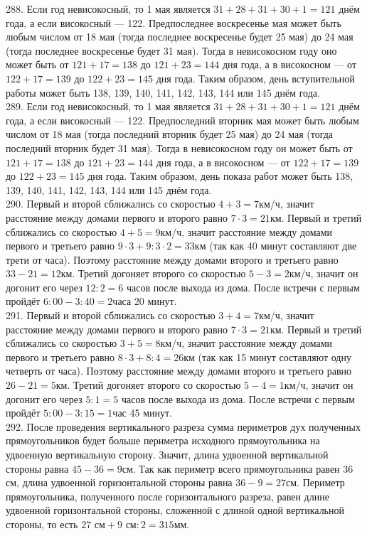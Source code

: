 288. Если год невисокосный, то 1 мая является $31+28+31+30+1=121$ днём года, а если високосный --- 122. Предпоследнее воскресенье мая может быть любым числом от 18 мая (тогда последнее воскресенье будет 25 мая) до 24 мая (тогда последнее воскресенье будет 31 мая). Тогда в невисокосном году оно может быть от $121+17=138$ до $121+23=144$ дня года, а в високосном --- от $122+17=139$ до $122+23=145$ дня года. Таким образом, день вступительной работы может быть 138, 139, 140, 141, 142, 143, 144 или 145 днём года.\\
289. Если год невисокосный, то 1 мая является $31+28+31+30+1=121$ днём года, а если високосный --- 122. Предпоследний вторник мая может быть любым числом от 18 мая (тогда последний вторник будет 25 мая) до 24 мая (тогда последний вторник будет 31 мая). Тогда в невисокосном году он может быть от $121+17=138$ до $121+23=144$ дня года, а в високосном --- от $122+17=139$ до $122+23=145$ дня года. Таким образом, день показа работ может быть 138, 139, 140, 141, 142, 143, 144 или 145 днём года.\\
290. Первый и второй сближались со скоростью $4+3=7$км/ч, значит расстояние между домами первого и второго равно $7\cdot3=21$км. Первый и третий сближались со скоростью $4+5=9$км/ч, значит расстояние между домами первого и третьего равно $9\cdot3+9:3\cdot2=33$км (так как 40 минут составляют две трети от часа). Поэтому расстояние между домами второго и третьего равно $33-21=12$км. Третий догоняет второго со скоростью $5-3=2$км/ч, значит он догонит его через $12:2=6$ часов после выхода из дома. После встречи с первым пройдёт $6:00-3:40=2$часа 20 минут.\\
291. Первый и второй сближались со скоростью $3+4=7$км/ч, значит расстояние между домами первого и второго равно $7\cdot3=21$км. Первый и третий сближались со скоростью $3+5=8$км/ч, значит расстояние между домами первого и третьего равно $8\cdot3+8:4=26$км (так как 15 минут составляют одну четверть от часа). Поэтому расстояние между домами второго и третьего равно $26-21=5$км. Третий догоняет второго со скоростью $5-4=1$км/ч, значит он догонит его через $5:1=5$ часов после выхода из дома. После встречи с первым пройдёт $5:00-3:15=1$час 45 минут.\\
292. После проведения вертикального разреза сумма периметров дух полученных прямоугольников будет больше периметра исходного прямоугольника на удвоенную вертикальную сторону. Значит, длина удвоенной вертикальной стороны равна $45-36=9$см. Так как периметр всего прямоугольника равен 36 см, длина удвоенной горизонтальной стороны равна $36-9=27$см. Периметр прямоугольника, полученного после горизонтального разреза, равен длине удвоенной горизонтальной стороны, сложенной с длиной одной вертикальной стороны, то есть $27\text{ см}+9\text{ см}:2=315$мм.\\
